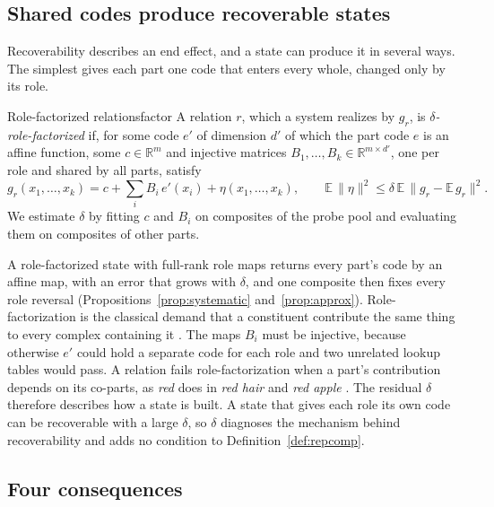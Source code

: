\documentclass[10pt]{article}
\theoremstyle{plain}
\theoremstyle{remark}
\newcommand{\R}{\mathbb{R}}
\begin{document}
\subsection{Shared codes produce recoverable states}
\label{sec:mechanics}

Recoverability describes an end effect, and a state can produce it in several ways. The simplest gives each part one code that enters every whole, changed only by its role.

\begin{defbox}{Role-factorized relations}{factor}
A relation $r$, which a system realizes by $g_r$, is \emph{$\delta$-role-factorized} if, for some code $e'$ of dimension $d'$ of which the part code $e$ is an affine function, some $c \in \R^m$ and injective matrices $B_1, \ldots, B_k \in \R^{m \times d'}$, one per role and shared by all parts, satisfy
\begin{equation}
  g_r(x_1, \ldots, x_k) = c + \textstyle\sum_{i} B_i\, e'(x_i) + \eta(x_1, \ldots, x_k), \qquad \mathbb{E}\,\lVert \eta \rVert^2 \le \delta\, \mathbb{E}\,\lVert g_r - \mathbb{E}\,g_r \rVert^2 .
  \label{eq:factor}
\end{equation}
We estimate $\delta$ by fitting $c$ and $B_i$ on composites of the probe pool and evaluating them on composites of other parts.
\end{defbox}

A role-factorized state with full-rank role maps returns every part's code by an affine map, with an error that grows with $\delta$, and one composite then fixes every role reversal (Propositions~\ref{prop:systematic} and~\ref{prop:approx}). Role-factorization is the classical demand that a constituent contribute the same thing to every complex containing it \citep{fodor1988}. The maps $B_i$ must be injective, because otherwise $e'$ could hold a separate code for each role and two unrelated lookup tables would pass. A relation fails role-factorization when a part's contribution depends on its co-parts, as \emph{red} does in \emph{red hair} and \emph{red apple} \citep{kamp1995}. The residual $\delta$ therefore describes how a state is built. A state that gives each role its own code can be recoverable with a large $\delta$, so $\delta$ diagnoses the mechanism behind recoverability and adds no condition to Definition~\ref{def:repcomp}.

\subsection{Four consequences}
\label{sec:consequences}
\end{document}
